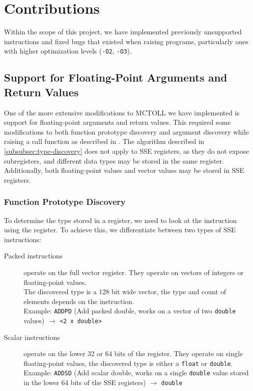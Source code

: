 

\chapter{Contributions}\label{ch:contributions}

Within the scope of this project, we have implemented previously unsupported instructions and fixed bugs that existed when raising programs, particularly ones with higher optimization levels (\texttt{-O2}, \texttt{-O3}).

\section{Support for Floating-Point Arguments and Return Values}\label{sec:support-for-floating-point-arguments-and-return-values}

One of the more extensive modifications to MCTOLL we have implemented is support for floating-point arguments and return values.
This required some modifications to both function prototype discovery and argument discovery while raising a call function as described in .
The algorithm described in \cref{subsubsec:type-discovery} does not apply to SSE registers, as they do not expose subregisters, and different data types may be stored in the same register.
Additionally, both floating-point values and vector values may be stored in SSE registers.

\subsection{Function Prototype Discovery}\label{subsec:function-prototype-discovery}

To determine the type stored in a register, we need to look at the instruction using the register.
To achieve this, we differentiate between two types of SSE instructions:

\begin{description}
    \item[Packed instructions] operate on the full vector register.
    They operate on vectors of integers or floating-point values. \\
    The discovered type is a 128 bit wide vector, the type and count of elements depends on the instruction. \\
    Example: \texttt{ADDPD} (Add packed double, works on a vector of two \texttt{double} values) $\rightarrow$ \texttt{<2 x double>}
    \item[Scalar instructions] operate on the lower 32 or 64 bits of the register.
    They operate on single floating-point values, the discovered type is either a \texttt{float} or \texttt{double}. \\
    Example: \texttt{ADDSD} (Add scalar double, works on a single \texttt{double}
    value stored in the lower 64 bits of the SSE registers) $\rightarrow$ \texttt{double}
\end{description}

